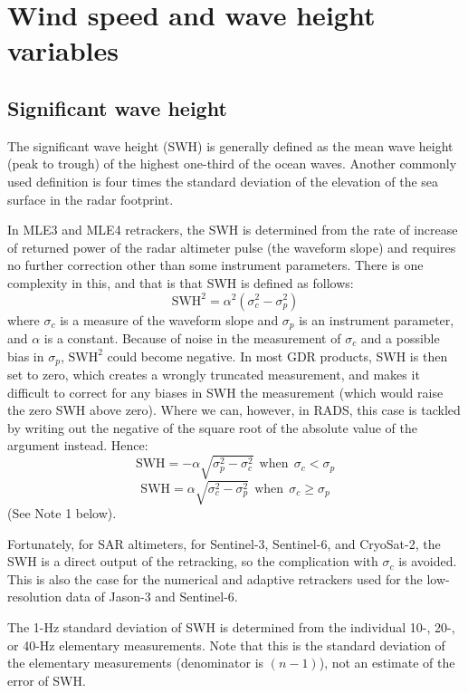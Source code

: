 \documentclass[a4paper,11pt,openany,natbib,nomargin]{thesis}
\begin{document}
\chapter{Wind speed and wave height variables}
\section{Significant wave height}
\label{var:swh}

The significant wave height (SWH) is generally defined as the mean wave height (peak to trough) of the highest one-third of the ocean waves. Another commonly used definition is four times the standard deviation of the elevation of the sea surface in the radar footprint.

In MLE3 and MLE4 retrackers, the SWH is determined from the rate of increase of returned power of the radar altimeter pulse (the waveform slope) and requires no further correction other than some instrument parameters. There is one complexity in this, and that is that SWH is defined as follows:
$$ \mathrm{SWH}^2 = \alpha^2 (\sigma_c^2 - \sigma_p^2) $$
where $\sigma_c$ is a measure of the waveform slope and $\sigma_p$ is an instrument parameter, and $\alpha$ is a constant. Because of noise in the measurement of $\sigma_c$ and a possible bias in $\sigma_p$, $\mathrm{SWH}^2$ could become negative. In most GDR products, SWH is then set to zero, which creates a wrongly truncated measurement, and makes it difficult to correct for any biases in SWH the measurement (which would raise the zero SWH above zero). Where we can, however, in RADS, this case is tackled by writing out the negative of the square root of the absolute value of the argument instead. Hence:
$$ \mathrm{SWH} = - \alpha \sqrt{\sigma_p^2 - \sigma_c^2} \mathrm{~~when~~} \sigma_c < \sigma_p $$
$$ \mathrm{SWH} = \alpha \sqrt{\sigma_c^2 - \sigma_p^2} \mathrm{~~when~~} \sigma_c \ge \sigma_p $$
(See Note 1 below).

Fortunately, for SAR altimeters, \ie{} for Sentinel-3, Sentinel-6, and CryoSat-2, the SWH is a direct output of the retracking, so the complication with $\sigma_c$ is avoided. This is also the case for the numerical and adaptive retrackers used for the low-resolution data of Jason-3 and Sentinel-6. 

The 1-Hz standard deviation of SWH is determined from the individual 10-, 20-, or 40-Hz elementary measurements. Note that this is the standard deviation of the elementary measurements (denominator is $(n-1)$), not an estimate of the error of SWH.
\end{document}
